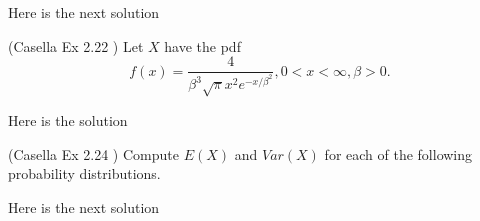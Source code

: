 \documentclass[12pt,letterpaper]{exam}
\begin{document}
\begin{questions}
	
	\begin{solution}
		Here is the next solution
	\end{solution}

	\setcounter{question}{21}
	\question (Casella Ex 2.22 ) Let $X$ have the pdf $$ f(x) = \frac{4}{\beta^3\sqrt{\pi} x^2 e^{-x/\beta^2}}, 0 < x < \infty, \beta > 0.$$
	
	\begin{solution}
		Here is the solution
	\end{solution}
	
	\setcounter{question}{23}
	\question  (Casella Ex 2.24 ) Compute $E(X)$ and $Var(X)$ for each of the following probability distributions.
	
	\begin{solution}
		Here is the next solution
	\end{solution}


\end{questions}
\end{document}
